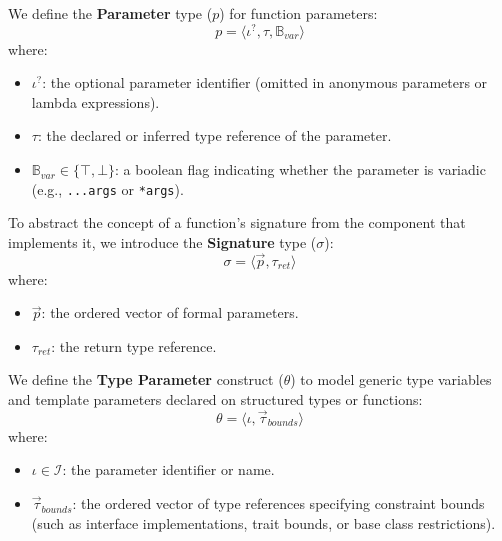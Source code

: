 We define the \textbf{Parameter} type ($p$) for function parameters:
$$p = \langle \iota^?, \tau, \mathbb{B}_{var} \rangle$$
where:
\begin{itemize}
  \item $\iota^?$: the optional parameter identifier (omitted in
    anonymous parameters or lambda expressions).
  \item $\tau$: the declared or inferred type reference of the parameter.
  \item $\mathbb{B}_{var} \in \{ \top, \bot \}$: a boolean flag
    indicating whether the parameter is variadic (e.g.,
    \texttt{...args} or \texttt{*args}).
\end{itemize}

To abstract the concept of a function's signature from the
component that implements it, we introduce the \textbf{Signature}
type ($\sigma$):
$$\sigma = \langle \vec{p}, \tau_{ret} \rangle$$
where:
\begin{itemize}
  \item $\vec{p}$: the ordered vector of formal parameters.
  \item $\tau_{ret}$: the return type reference.
\end{itemize}

We define the \textbf{Type Parameter} construct ($\theta$) to model generic
type variables and template parameters declared on structured types
or functions:
$$\theta = \langle \iota, \vec{\tau}_{bounds} \rangle$$
where:
\begin{itemize}
  \item $\iota \in \mathcal{I}$: the parameter identifier or name.
  \item $\vec{\tau}_{bounds}$: the ordered vector of type references specifying
    constraint bounds (such as interface implementations, trait bounds, or base
    class restrictions).
\end{itemize}

